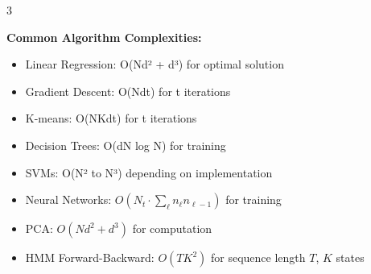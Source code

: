 \documentclass[10pt,landscape]{article}
\begin{document}
\begin{multicols}{3}
\begin{tcolorbox}[breakable, title=Time Complexity Analysis, colback=white]
\textbf{Common Algorithm Complexities:}
\begin{itemize}[leftmargin=*,noitemsep,topsep=0pt]
    \item Linear Regression: O(Nd² + d³) for optimal solution
    \item Gradient Descent: O(Ndt) for t iterations
    \item K-means: O(NKdt) for t iterations
    \item Decision Trees: O(dN log N) for training
    \item SVMs: O(N² to N³) depending on implementation
    \item Neural Networks: $O(N_t \cdot \sum_{\ell} n_{\ell} n_{\ell-1})$ for training
    \item PCA: $O(Nd^2 + d^3)$ for computation
    \item HMM Forward-Backward: $O(TK^2)$ for sequence length $T$, $K$ states
\end{itemize}
\end{tcolorbox}

\end{multicols}
\end{document}
